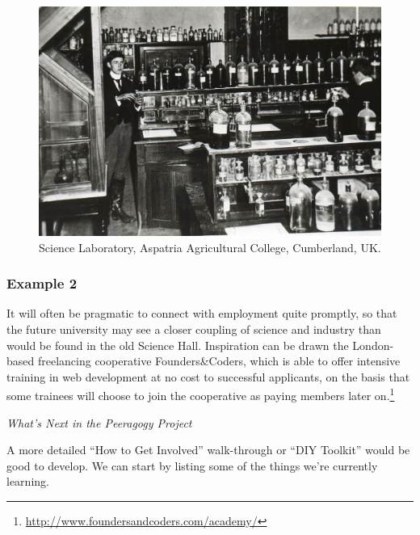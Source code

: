 \begin{figure}
\vspace{-1cm}
\begin{center}
\includegraphics[width=.45\textwidth]{The_Science_Laboratory}
\end{center}
\vspace{-.5cm}
\caption{Science Laboratory, Aspatria Agricultural College, Cumberland, UK. 
\label{science-laboratory}}
\vspace{-.6cm}
\end{figure}

\subsubsection*{Example 2} It will often be pragmatic to connect
 with employment quite promptly, so that
the future university may see a closer coupling of science and
industry than would be found in the old Science Hall.  Inspiration can
be drawn the London-based freelancing cooperative Founders\&Coders,
which is able to offer intensive training in web development at no
cost to successful applicants, on the basis that some trainees will
choose to join the cooperative as paying members later
on.\footnote{\url{http://www.foundersandcoders.com/academy/}}


\begin{framed}
\noindent 
\emph{What's Next in the Peeragogy Project}
\begin{collectinmacro}{\NewcomerWN}{}{}
A more detailed ``How to Get Involved'' walk-through or ``DIY Toolkit'' would be good to develop. We can start by listing some of the things we're currently learning.
\end{collectinmacro}
\NewcomerWN
\end{framed}

\newpage
